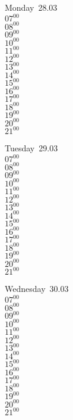 \documentclass[11pt,a4paper]{book}\usepackage[]{graphicx}\usepackage[]{color}
\begin{document}
\begin{headerbox}
\end{headerbox}
\begin{weekdaybox}
  Monday~28.03\\
  { 
  \vfill
  $07^{00}$\\
$08^{00}$\\
$09^{00}$\\
$10^{00}$\\
$11^{00}$\\
$12^{00}$\\
$13^{00}$\\
$14^{00}$\\
$15^{00}$\\
$16^{00}$\\
$17^{00}$\\
$18^{00}$\\
$19^{00}$\\
$20^{00}$\\
$21^{00}$\\
  }
\end{weekdaybox}
\begin{weekdaybox}
  Tuesday~29.03\\
  { 
  \vfill
  $07^{00}$\\
$08^{00}$\\
$09^{00}$\\
$10^{00}$\\
$11^{00}$\\
$12^{00}$\\
$13^{00}$\\
$14^{00}$\\
$15^{00}$\\
$16^{00}$\\
$17^{00}$\\
$18^{00}$\\
$19^{00}$\\
$20^{00}$\\
$21^{00}$\\
  }
\end{weekdaybox}
\begin{weekdaybox}
  Wednesday~30.03\\
  { 
  \vfill
  $07^{00}$\\
$08^{00}$\\
$09^{00}$\\
$10^{00}$\\
$11^{00}$\\
$12^{00}$\\
$13^{00}$\\
$14^{00}$\\
$15^{00}$\\
$16^{00}$\\
$17^{00}$\\
$18^{00}$\\
$19^{00}$\\
$20^{00}$\\
$21^{00}$\\
  }
\end{weekdaybox}
\end{document}
